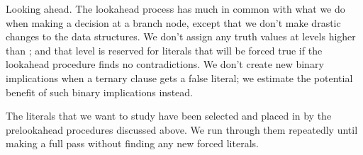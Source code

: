 Looking ahead. The lookahead process has much in common
with what
we do when making a decision at a branch node, except that we
don't make drastic changes to the data structures. We don't
assign any truth values at levels higher than ; and
that level is reserved for literals that will be forced true if the
lookahead procedure finds no contradictions. We don't create
new binary implications when a ternary clause gets a false literal;
we estimate the potential benefit of such binary implications instead.

The literals that we want to study have been selected and placed in 
by the prelookahead procedures discussed above. We run through them
repeatedly until making a full pass without finding any new forced literals.

